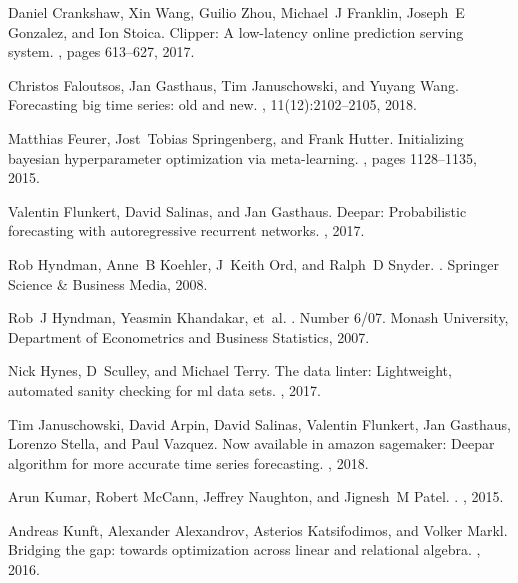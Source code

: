 \documentclass[11pt]{article}
\begin{document}
\begin{thebibliography}{10}
Daniel Crankshaw, Xin Wang, Guilio Zhou, Michael~J Franklin, Joseph~E Gonzalez,
  and Ion Stoica.
\newblock Clipper: A low-latency online prediction serving system.
, pages 613--627, 2017.

Christos Faloutsos, Jan Gasthaus, Tim Januschowski, and Yuyang Wang.
\newblock Forecasting big time series: old and new.
, 11(12):2102--2105, 2018.

Matthias Feurer, Jost~Tobias Springenberg, and Frank Hutter.
\newblock Initializing bayesian hyperparameter optimization via meta-learning.
, pages 1128--1135, 2015.

Valentin Flunkert, David Salinas, and Jan Gasthaus.
\newblock Deepar: Probabilistic forecasting with autoregressive recurrent
  networks.
, 2017.

Rob Hyndman, Anne~B Koehler, J~Keith Ord, and Ralph~D Snyder.
.
\newblock Springer Science \& Business Media, 2008.

Rob~J Hyndman, Yeasmin Khandakar, et~al.
.
\newblock Number 6/07. Monash University, Department of Econometrics and
  Business Statistics, 2007.

Nick Hynes, D~Sculley, and Michael Terry.
\newblock The data linter: Lightweight, automated sanity checking for ml data
  sets.
, 2017.

Tim Januschowski, David Arpin, David Salinas, Valentin Flunkert, Jan Gasthaus,
  Lorenzo Stella, and Paul Vazquez.
\newblock Now available in amazon sagemaker: Deepar algorithm for more accurate
  time series forecasting.
,
  2018.

Arun Kumar, Robert McCann, Jeffrey Naughton, and Jignesh~M Patel.
.
, 2015.

Andreas Kunft, Alexander Alexandrov, Asterios Katsifodimos, and Volker Markl.
\newblock Bridging the gap: towards optimization across linear and relational
  algebra.
, 2016.


\end{thebibliography}
\end{document}
